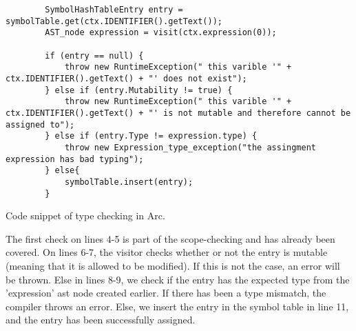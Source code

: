 \begin{listing}[htb!]
    \begin{verbatim}
        SymbolHashTableEntry entry = symbolTable.get(ctx.IDENTIFIER().getText());
        AST_node expression = visit(ctx.expression(0));

        if (entry == null) {
            throw new RuntimeException(" this varible '" + ctx.IDENTIFIER().getText() + "' does not exist");
        } else if (entry.Mutability != true) {
            throw new RuntimeException(" this varible '" + ctx.IDENTIFIER().getText() + "' is not mutable and therefore cannot be assigned to");
        } else if (entry.Type != expression.type) {
            throw new Expression_type_exception("the assingment expression has bad typing");
        } else{
            symbolTable.insert(entry);
        }
    \end{verbatim}
    \caption{Code snippet of type checking in Arc.}
    \label{lst:typecheckerexample}
\end{listing}


The first check on lines 4-5 is part of the scope-checking and has already been covered. On lines 6-7, the visitor checks whether or not the entry is mutable (meaning that it is allowed to be modified). If this is not the case, an error will be thrown. Else in lines 8-9, we check if the entry has the expected type from the 'expression' \gls{ast} node created earlier. If there has been a type mismatch, the compiler throws an error. Else, we insert the entry in the symbol table in line 11, and the entry has been successfully assigned.
